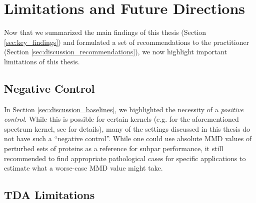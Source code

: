 \section{Limitations and Future Directions}\label{sec:discussion_limitations}

Now that we summarized the main findings of this thesis (Section
\ref{sec:key_findings}) and formulated a set of recommendations to the
practitioner (Section \ref{sec:discussion_recommendations}), we now highlight
important limitations of this thesis.


\subsection{Negative Control}

In Section \ref{sec:discussion_baselines}, we highlighted the necessity of a
\emph{positive control}. While this is possible for certain kernels (e.g. for
the aforementioned spectrum kernel, see \cite{kucera2021conditional} for
details), many of the settings discussed in this thesis do not have such a
``negative control''. While one could use absolute MMD values of perturbed sets
of proteins as a reference for subpar performance, it still recommended to find
appropriate pathological cases for specific applications to estimate what a worse-case
MMD value might take.



\subsection{TDA Limitations}\label{sec:tda_limitations}

